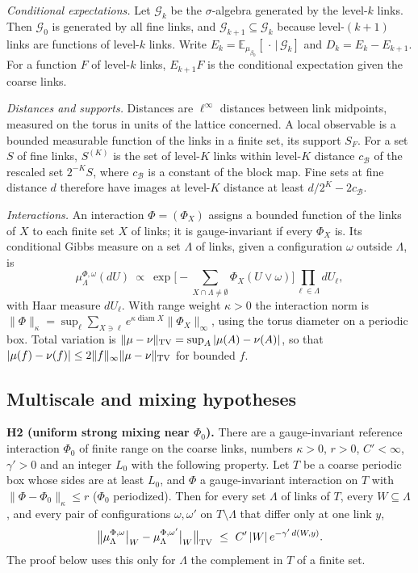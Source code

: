 \documentclass[11pt,a4paper]{article}
\begin{document}
\emph{Conditional expectations.} Let \(\mathcal G_k\) be the
\(\sigma\)-algebra generated by the level-\(k\) links. Then
\(\mathcal G_0\) is generated by all fine links, and
\(\mathcal G_{k+1}\subseteq\mathcal G_k\) because level-\((k+1)\) links
are functions of level-\(k\) links. Write
\(E_k=\mathbb E_{\mu_{\beta_0}}[\,\cdot\,|\,\mathcal G_k]\) and
\(D_k=E_k-E_{k+1}\). For a function \(F\) of level-\(k\) links,
\(E_{k+1}F\) is the conditional expectation given the coarse links.

\emph{Distances and supports.} Distances are \(\ell^\infty\) distances
between link midpoints, measured on the torus in units of the lattice
concerned. A local observable is a bounded measurable function of the
links in a finite set, its support \(S_F\). For a set \(S\) of fine
links, \(S^{(K)}\) is the set of level-\(K\) links within level-\(K\)
distance \(c_{\mathcal B}\) of the rescaled set \(2^{-K}S\), where
\(c_{\mathcal B}\) is a constant of the block map. Fine sets at fine
distance \(d\) therefore have images at level-\(K\) distance at least
\(d/2^K-2c_{\mathcal B}\).

\emph{Interactions.} An interaction \(\Phi=(\Phi_X)\) assigns a bounded
function of the links of \(X\) to each finite set \(X\) of links; it is
gauge-invariant if every \(\Phi_X\) is. Its conditional Gibbs measure on
a set \(\Lambda\) of links, given a configuration \(\omega\) outside
\(\Lambda\), is
\[\mu^{\Phi,\omega}_\Lambda(dU)\ \propto\ \exp\Big[-\sum_{X\cap\Lambda\ne\emptyset}\Phi_X(U\vee\omega)\Big]\prod_{\ell\in\Lambda}dU_\ell ,\]
with Haar measure \(dU_\ell\). With range weight \(\kappa>0\) the
interaction norm is
\(\|\Phi\|_\kappa=\sup_\ell\sum_{X\ni\ell}e^{\kappa\operatorname{diam}X}\|\Phi_X\|_\infty\),
using the torus diameter on a periodic box. Total variation is
\(\|\mu-\nu\|_{\rm TV}=\sup_A|\mu(A)-\nu(A)|\), so that
\(|\mu(f)-\nu(f)|\le2\|f\|_\infty\|\mu-\nu\|_{\rm TV}\) for bounded
\(f\).

\hypertarget{multiscale-and-mixing-hypotheses}{%
\subsection{Multiscale and mixing
hypotheses}\label{multiscale-and-mixing-hypotheses}}

\textbf{H2 (uniform strong mixing near \(\Phi_0\)).} There are a
gauge-invariant reference interaction \(\Phi_0\) of finite range on the
coarse links, numbers \(\kappa>0\), \(r>0\), \(C'<\infty\),
\(\gamma'>0\) and an integer \(L_0\) with the following property. Let
\(T\) be a coarse periodic box whose sides are at least \(L_0\), and
\(\Phi\) a gauge-invariant interaction on \(T\) with
\(\|\Phi-\Phi_0\|_\kappa\le r\) (\(\Phi_0\) periodized). Then for every
set \(\Lambda\) of links of \(T\), every \(W\subseteq\Lambda\), and
every pair of configurations \(\omega,\omega'\) on \(T\setminus\Lambda\)
that differ only at one link \(y\),
\[\big\|\mu_\Lambda^{\Phi,\omega}\big|_W-\mu_\Lambda^{\Phi,\omega'}\big|_W\big\|_{\rm TV}\ \le\ C'\,|W|\,e^{-\gamma'\,d(W,y)} .\]
The proof below uses this only for \(\Lambda\) the complement in \(T\)
of a finite set.
\end{document}
